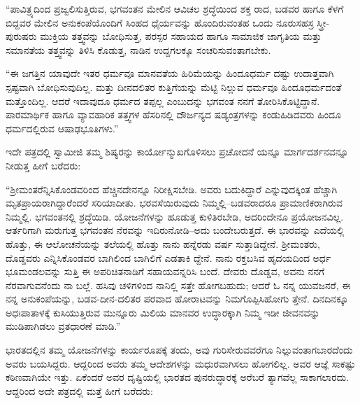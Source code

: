 “ಪಾವಿತ್ರ್ಯದಿಂದ ಪ್ರಜ್ವಲಿಸುತ್ತಿರುವ, ಭಗವಂತನ ಮೇಲಿನ ಆವಿಚಲ ಶ್ರದ್ಧೆಯಿಂದ ಶಕ್ತ ರಾದ, ಬಡವರ ಹಾಗೂ ಕೆಳಗೆ ಬಿದ್ದವರ ಮೇಲಿನ ಅನುಕಂಪೆಯೊಂದಿಗೆ ಸಿಂಹದ ಧೈರ್ಯವನ್ನು ಹೊಂದಿರುವಂತಹ ಒಂದು ನೂರುಸಹಸ್ರ ಸ್ತ್ರೀ-ಪುರುಷರು ಮುಕ್ತಿಯ ತತ್ತ್ವವನ್ನು ಬೋಧಿಸುತ್ತ, ಪರಸ್ಪರ ಸಹಾಯದ ಹಾಗೂ ಸಾಮಾಜಿಕ ಜಾಗೃತಿಯ ಮತ್ತು ಸಮಾನತೆಯ ತತ್ತ್ವವನ್ನು ತಿಳಿಸಿ ಕೊಡುತ್ತ, ನಾಡಿನ ಉದ್ದಗಲಕ್ಕೂ ಸಂಚರಿಸುವಂತಾಗಬೇಕು.

“ಈ ಜಗತ್ತಿನ ಯಾವುದೇ ಇತರ ಧರ್ಮವೂ ಮಾನವತೆಯ ಹಿರಿಮೆಯನ್ನು ಹಿಂದೂಧರ್ಮ ದಷ್ಟು ಉದಾತ್ತವಾಗಿ ಸ್ಪಷ್ಟವಾಗಿ ಬೋಧಿಸುವುದಿಲ್ಲ. ಮತ್ತು ದೀನದಲಿತರ ಕುತ್ತಿಗೆಯನ್ನು ಮೆಟ್ಟಿ ನಿಲ್ಲುವ ಧರ್ಮವೂ ಹಿಂದೂಧರ್ಮದಂತೆ ಮತ್ತೊಂದಿಲ್ಲ. ಆದರೆ ಇದಾವುದೂ ಧರ್ಮದ ತಪ್ಪಲ್ಲ ಎಂಬುದನ್ನು ಭಗವಂತ ನನಗೆ ತೋರಿಸಿಕೊಟ್ಟಿದ್ದಾನೆ. ಪಾರಮಾರ್ಥಿಕ ಹಾಗೂ ವ್ಯಾವಹಾರಿಕ ತತ್ತ್ವಗಳ ಹೆಸರಿನಲ್ಲಿ ದೌರ್ಜನ್ಯದ ಷಡ್ಯಂತ್ರಗಳನ್ನು ಕಂಡುಹಿಡಿದವರು ಹಿಂದೂ ಧರ್ಮದಲ್ಲಿರುವ ಆಷಾಢಭೂತಿಗಳು.”

ಇದೇ ಪತ್ರದಲ್ಲಿ ಸ್ವಾಮೀಜಿ ತಮ್ಮ ಶಿಷ್ಯರನ್ನು ಕಾರ್ಯೋನ್ಮುಖಗೊಳಿಸಲು ಪ್ರಚೋದನೆ ಯನ್ನೂ ಮಾರ್ಗದರ್ಶನವನ್ನೂ ನೀಡುತ್ತ ಹೀಗೆ ಬರೆದರು:

“ಶ್ರೀಮಂತರೆನ್ನಿಸಿಕೊಂಡವರಿಂದ ಹೆಚ್ಚಿನದೇನನ್ನೂ ನಿರೀಕ್ಷಿಸಬೇಡಿ. ಅವರು ಬದುಕಿದ್ದಾರೆ ಎನ್ನುವುದಕ್ಕಿಂತ ಹೆಚ್ಚಾಗಿ ಮೃತಪ್ರಾಯರಾಗಿದ್ದಾರೆಂದರೆ ಸರಿಯಾದೀತು. ಭರವಸೆಯಿರುವುದು ನಿಮ್ಮಲ್ಲಿ–ಬಡವರಾದರೂ ಪ್ರಾಮಾಣಿಕರಾಗಿರುವ ನಿಮ್ಮಲ್ಲಿ. ಭಗವಂತನಲ್ಲಿ ಶ್ರದ್ಧೆಯಿಡಿ. ಯೋಜನೆಗಳನ್ನು ಹೂಡುತ್ತ ಕುಳಿತಿರಬೇಡಿ, ಅದರಿಂದೇನೂ ಪ್ರಯೋಜನವಿಲ್ಲ. ಆರ್ತರಿಗಾಗಿ ಮರುಗುತ್ತ ಭಗವಂತನ ನೆರವನ್ನು ಇದಿರುನೋಡಿ–ಅದು ಬಂದೇಬರುತ್ತದೆ. ಈ ಭಾರವನ್ನು ಎದೆಯಲ್ಲಿ ಹೊತ್ತು, ಈ ಆಲೋಚನೆಯನ್ನು ತಲೆಯಲ್ಲಿ ಹೊತ್ತು ನಾನು ಹನ್ನೆರಡು ವರ್ಷ ಸುತ್ತಾಡಿದ್ದೇನೆ. ಶ್ರೀಮಂತರು, ದೊಡ್ಡವರು ಎನ್ನಿಸಿಕೊಂಡವರ ಬಾಗಿಲಿಂದ ಬಾಗಿಲಿಗೆ ಎಡತಾಕಿ ದ್ದೇನೆ. ನಾನು ರಕ್ತಬಸಿವ ಹೃದಯದಿಂದ ಅರ್ಧ ಭೂಮಂಡಲವನ್ನು ಸುತ್ತಿ ಈ ಅಪರಿಚಿತನಾಡಿಗೆ ಸಹಾಯವನ್ನರಿಸಿ ಬಂದೆ. ದೇವರು ದೊಡ್ಡವ, ಅವನು ನನಗೆ ನೆರವಾಗುವನೆಂದು ನಾ ಬಲ್ಲೆ. ಹಸಿವು ಚಳಿಗಳಿಂದ ನಾನಿಲ್ಲಿ ಸತ್ತೇ ಹೋಗಬಹುದು; ಆದರೆ ಓ ನನ್ನ ಯುವಜನರೆ, ಈ ನನ್ನ ಅನುಕಂಪೆಯನ್ನು, ಬಡವ-ದೀನ-ದಲಿತರ ಪರವಾದ ಹೋರಾಟವನ್ನು ನಿಮಗೊಪ್ಪಿಸಿಹೋಗು ತ್ತೇನೆ. ದಿನದಿನಕ್ಕೂ ಅಧಃಪಾತಾಳಕ್ಕೆ ಕುಸಿಯುತ್ತಿರುವ ಮುನ್ನೂರು ಮಿಲಿಯ ಮಾನವರ ಉದ್ಧಾರಕ್ಕಾಗಿ ನಿಮ್ಮ ಇಡೀ ಜೀವನವನ್ನು ಮುಡಿಪಾಗಿಡಲು ವ್ರತಧಾರಣೆ ಮಾಡಿ.”

ಭಾರತದಲ್ಲಿನ ತಮ್ಮ ಯೋಜನೆಗಳನ್ನು ಕಾರ್ಯರೂಪಕ್ಕೆ ತಂದು, ಅವು ಗುರಿಸೇರುವವರೆಗೂ ನಿಲ್ಲುವಂತಾಗಬಾರದೆಂದು ಅವರು ಬಯಸಿದ್ದರು. ಆದ್ದರಿಂದ ಅವರು ತಮ್ಮ ಆದೇಶಗಳನ್ನು ಮಧುರವಾಗಿಸಲು ಹೋಗಲಿಲ್ಲ. ಅವರ ಆಜ್ಞೆ ಸಾಕಷ್ಟು ಕಠಿಣವಾಗಿಯೇ ಇತ್ತು. ಏಕೆಂದರೆ ಅವರ ದೃಷ್ಟಿಯಲ್ಲಿ ಭಾರತದ ಪುನರುದ್ಧಾರಕ್ಕೆ ಅರೆಬರೆ ತ್ಯಾಗವೆಲ್ಲ ಸಾಕಾಗಲಾರದು. ಆದ್ದರಿಂದ ಅದೇ ಪತ್ರದಲ್ಲಿ ಮತ್ತೆ ಹೀಗೆ ಬರೆದರು:

